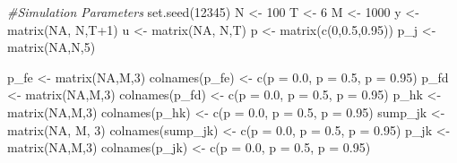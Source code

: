 \documentclass[
]{article}
\newenvironment{Shaded}{\begin{snugshade}}{\end{snugshade}}
\newcommand{\CommentTok}[1]{\textcolor[rgb]{0.56,0.35,0.01}{\textit{#1}}}
\newcommand{\ConstantTok}[1]{\textcolor[rgb]{0.00,0.00,0.00}{#1}}
\newcommand{\DecValTok}[1]{\textcolor[rgb]{0.00,0.00,0.81}{#1}}
\newcommand{\FloatTok}[1]{\textcolor[rgb]{0.00,0.00,0.81}{#1}}
\newcommand{\FunctionTok}[1]{\textcolor[rgb]{0.00,0.00,0.00}{#1}}
\newcommand{\NormalTok}[1]{#1}
\newcommand{\OtherTok}[1]{\textcolor[rgb]{0.56,0.35,0.01}{#1}}
\newcommand{\SpecialCharTok}[1]{\textcolor[rgb]{0.00,0.00,0.00}{#1}}
\newcommand{\StringTok}[1]{\textcolor[rgb]{0.31,0.60,0.02}{#1}}
\begin{document}
\begin{Shaded}
\begin{Highlighting}[]
\CommentTok{\#Simulation Parameters}
\FunctionTok{set.seed}\NormalTok{(}\DecValTok{12345}\NormalTok{)}
\NormalTok{N }\OtherTok{\textless{}{-}} \DecValTok{100}
\NormalTok{T }\OtherTok{\textless{}{-}} \DecValTok{6}
\NormalTok{M }\OtherTok{\textless{}{-}} \DecValTok{1000}
\NormalTok{y }\OtherTok{\textless{}{-}} \FunctionTok{matrix}\NormalTok{(}\ConstantTok{NA}\NormalTok{, N,T}\SpecialCharTok{+}\DecValTok{1}\NormalTok{)}
\NormalTok{u }\OtherTok{\textless{}{-}} \FunctionTok{matrix}\NormalTok{(}\ConstantTok{NA}\NormalTok{, N,T)}
\NormalTok{p }\OtherTok{\textless{}{-}} \FunctionTok{matrix}\NormalTok{(}\FunctionTok{c}\NormalTok{(}\DecValTok{0}\NormalTok{,}\FloatTok{0.5}\NormalTok{,}\FloatTok{0.95}\NormalTok{))}
\NormalTok{p\_j }\OtherTok{\textless{}{-}} \FunctionTok{matrix}\NormalTok{(}\ConstantTok{NA}\NormalTok{,N,}\DecValTok{5}\NormalTok{)}


\NormalTok{p\_fe }\OtherTok{\textless{}{-}} \FunctionTok{matrix}\NormalTok{(}\ConstantTok{NA}\NormalTok{,M,}\DecValTok{3}\NormalTok{)}
\FunctionTok{colnames}\NormalTok{(p\_fe) }\OtherTok{\textless{}{-}} \FunctionTok{c}\NormalTok{(}\StringTok{\textquotesingle{}p = 0.0\textquotesingle{}}\NormalTok{, }\StringTok{\textquotesingle{}p = 0.5\textquotesingle{}}\NormalTok{, }\StringTok{\textquotesingle{}p = 0.95\textquotesingle{}}\NormalTok{)}
\NormalTok{p\_fd }\OtherTok{\textless{}{-}} \FunctionTok{matrix}\NormalTok{(}\ConstantTok{NA}\NormalTok{,M,}\DecValTok{3}\NormalTok{)}
\FunctionTok{colnames}\NormalTok{(p\_fd) }\OtherTok{\textless{}{-}} \FunctionTok{c}\NormalTok{(}\StringTok{\textquotesingle{}p = 0.0\textquotesingle{}}\NormalTok{, }\StringTok{\textquotesingle{}p = 0.5\textquotesingle{}}\NormalTok{, }\StringTok{\textquotesingle{}p = 0.95\textquotesingle{}}\NormalTok{)}
\NormalTok{p\_hk }\OtherTok{\textless{}{-}} \FunctionTok{matrix}\NormalTok{(}\ConstantTok{NA}\NormalTok{,M,}\DecValTok{3}\NormalTok{)}
\FunctionTok{colnames}\NormalTok{(p\_hk) }\OtherTok{\textless{}{-}} \FunctionTok{c}\NormalTok{(}\StringTok{\textquotesingle{}p = 0.0\textquotesingle{}}\NormalTok{, }\StringTok{\textquotesingle{}p = 0.5\textquotesingle{}}\NormalTok{, }\StringTok{\textquotesingle{}p = 0.95\textquotesingle{}}\NormalTok{)}
\NormalTok{sump\_jk }\OtherTok{\textless{}{-}} \FunctionTok{matrix}\NormalTok{(}\ConstantTok{NA}\NormalTok{, M, }\DecValTok{3}\NormalTok{)}
\FunctionTok{colnames}\NormalTok{(sump\_jk) }\OtherTok{\textless{}{-}} \FunctionTok{c}\NormalTok{(}\StringTok{\textquotesingle{}p = 0.0\textquotesingle{}}\NormalTok{, }\StringTok{\textquotesingle{}p = 0.5\textquotesingle{}}\NormalTok{, }\StringTok{\textquotesingle{}p = 0.95\textquotesingle{}}\NormalTok{)}
\NormalTok{p\_jk }\OtherTok{\textless{}{-}} \FunctionTok{matrix}\NormalTok{(}\ConstantTok{NA}\NormalTok{,M,}\DecValTok{3}\NormalTok{)}
\FunctionTok{colnames}\NormalTok{(p\_jk) }\OtherTok{\textless{}{-}} \FunctionTok{c}\NormalTok{(}\StringTok{\textquotesingle{}p = 0.0\textquotesingle{}}\NormalTok{, }\StringTok{\textquotesingle{}p = 0.5\textquotesingle{}}\NormalTok{, }\StringTok{\textquotesingle{}p = 0.95\textquotesingle{}}\NormalTok{)}


\end{Highlighting}
\end{Shaded}
\end{document}
